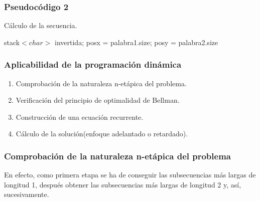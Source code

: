 \documentclass[13pt]{beamer}
\begin{document}
    \begin{frame}
        \frametitle{Pseudocódigo 2}
        
        \begin{algorithm}[H]
            \caption{Cálculo de la secuencia.}
          
            stack$<char>$ invertida; posx = palabra1.size; posy = palabra2.size\;
          
          \end{algorithm}
    \end{frame}

    \begin{frame}
		\frametitle{Aplicabilidad de la programación dinámica}
        \begin{enumerate}
            \item Comprobación de la naturaleza n-etápica del problema. 
            \item Verificación del principio de optimalidad de Bellman. 
            \item Construcción de una ecuación recurrente. 
            \item Cálculo de la solución(enfoque adelantado o retardado). 
        \end{enumerate}
	\end{frame}

    \begin{frame}
		\frametitle{Comprobación de la naturaleza n-etápica del problema}
        En efecto, como primera etapa se ha de conseguir las subsecuencias más largas de longitud 1, 
        después obtener las subsecuencias más largas de longitud 2 y, así, sucesivamente. 
	\end{frame}
\end{document}
